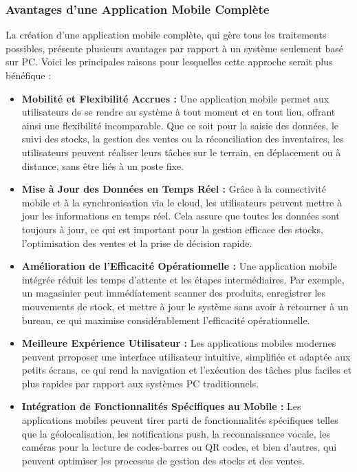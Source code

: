 \documentclass[a4paper, oneside, 12pt, final]{extreport}
\begin{document}
\subsubsection{Avantages d'une Application Mobile Complète}
La création d'une application mobile complète, qui gère tous les traitements possibles, présente plusieurs avantages par rapport à un système seulement basé sur PC. Voici les principales raisons pour lesquelles cette approche serait plus bénéfique :
\begin{itemize}
\item \textbf{Mobilité et Flexibilité Accrues :} Une application mobile permet aux utilisateurs de se rendre au système à tout moment et en tout lieu, offrant ainsi une flexibilité incomparable. Que ce soit pour la saisie des données, le suivi des stocks, la gestion des ventes ou la réconciliation des inventaires, les utilisateurs peuvent réaliser leurs tâches sur le terrain, en déplacement ou à distance, sans être liés à un poste fixe.

\item \textbf{Mise à Jour des Données en Temps Réel :} Grâce à la connectivité mobile et à la synchronisation via le cloud, les utilisateurs peuvent mettre à jour les informations en temps réel. Cela assure que toutes les données sont toujours à jour, ce qui est important pour la gestion efficace des stocks, l'optimisation des ventes et la prise de décision rapide.

\item \textbf{Amélioration de l'Efficacité Opérationnelle :} Une application mobile intégrée réduit les temps d'attente et les étapes intermédiaires. Par exemple, un magasinier peut immédiatement scanner des produits, enregistrer les mouvements de stock, et mettre à jour le système sans avoir à retourner à un bureau, ce qui maximise considérablement l'efficacité opérationnelle.

\item \textbf{Meilleure Expérience Utilisateur :} Les applications mobiles modernes peuvent prroposer une interface utilisateur intuitive, simplifiée et adaptée aux petits écrans, ce qui rend la navigation et l'exécution des tâches plus faciles et plus rapides par rapport aux systèmes PC traditionnels.

\item \textbf{Intégration de Fonctionnalités Spécifiques au Mobile :} Les applications mobiles peuvent tirer parti de fonctionnalités spécifiques telles que la géolocalisation, les notifications push, la reconnaissance vocale, les caméras pour la lecture de codes-barres ou QR codes, et bien d'autres, qui peuvent optimiser les processus de gestion des stocks et des ventes.
\end{itemize}
\end{document}
